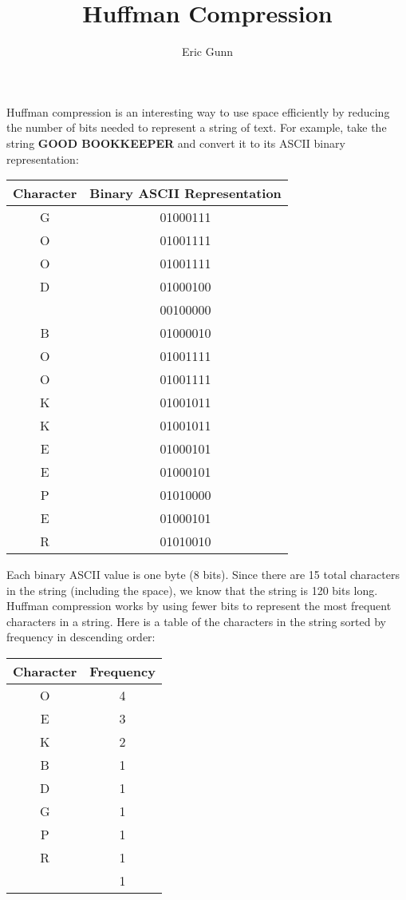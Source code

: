 \documentclass{article}
\title{Huffman Compression}
\author{Eric Gunn}
\date{}
\begin{document}
\def\pgfsysdriver{pgfsys-tex4ht.def}
\maketitle

\noindent Huffman compression is an interesting way to use space efficiently by reducing the number of bits needed to represent a string of text. For example, take the string \textbf{GOOD BOOKKEEPER} and convert it to its ASCII binary representation:
	\begin{center}
		\begin{tabular}{| c | c |}
			\hline
			Character & Binary ASCII Representation\\
			\hline
			G & 01000111\\
			O & 01001111\\
			O & 01001111\\
			D & 01000100\\
			  & 00100000\\
			B & 01000010\\
			O & 01001111\\
			O & 01001111\\
			K & 01001011\\
			K & 01001011\\
			E & 01000101\\
			E & 01000101\\
			P & 01010000\\
			E & 01000101\\
			R & 01010010\\
			\hline
		\end{tabular}
	\end{center}
\noindent Each binary ASCII value is one byte (8 bits). Since there are 15 total characters in the string (including the space), we know that the string is 120 bits long. Huffman compression works by using fewer bits to represent the most frequent characters in a string. Here is a table of the characters in the string sorted by frequency in descending order:
	\begin{center}
		\begin{tabular}{| c | c |}
			\hline
			Character & Frequency\\
			\hline
			O & 4\\
			E & 3\\
			K & 2\\
			B & 1\\
			D & 1\\
			G & 1\\
			P & 1\\
			R & 1\\
			  & 1\\
			\hline
		\end{tabular}
	\end{center}
\end{document}
